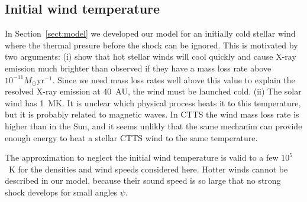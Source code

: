 \subsection{Initial wind temperature}
\label{sect:T_0}
In Section~\ref{sect:model} we developed our model for an initially cold stellar wind where the thermal presure before the shock can be ignored. This is motivated by two arguments: (i) \citet{2007IAUS..243..299M} show that hot stellar winds will cool quickly and cause X-ray emission much brighter than observed if they have a mass loss rate above $10^{-11}M_\odot\mathrm{ yr}^{-1}$. Since we need mass loss rates well above this value to explain the resolved X-ray emission at 40~AU, the wind must be launched cold. (ii) The solar wind has 1~MK. It is unclear which physical process heats it to this temperature, but it is probably related to magnetic waves. In CTTS the wind mass loss rate is higher than in the Sun, and it seems unlikly that the same mechanim can provide enough energy to heat a stellar CTTS wind to the same temperature.

The approximation to neglect the initial wind temperature is valid to a few $10^5$~K for the densities and wind speeds considered here. Hotter winds cannot be described in our model, because their sound speed is so large that no strong shock develops for small angles $\psi$.